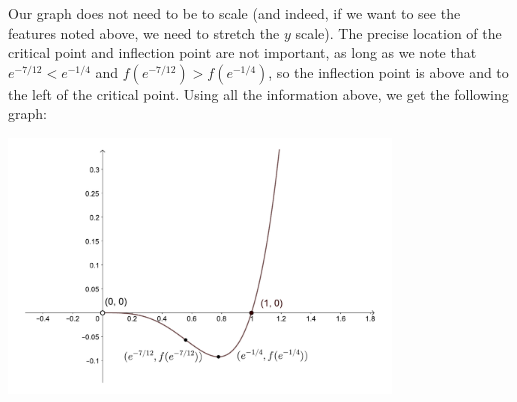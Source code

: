 \documentclass[12pt]{article}
\begin{document}
\begin{enumerate}
\begin{enumerate}
  Our graph does not need to be to scale (and indeed, if we want to see the features noted above, we need to stretch the $y$ scale). The precise location of the critical point and inflection point are not important, as long as we note that $e^{-7/12}<e^{-1/4}$ and $f(e^{-7/12})>f(e^{-1/4})$, so the inflection point is above and to the left of the critical point. Using all the information above, we get the following graph:
  \begin{center}
  \includegraphics[width=4in]{Tut09Graph}
  \end{center}
  \end{enumerate}
\end{enumerate}
\end{document}
